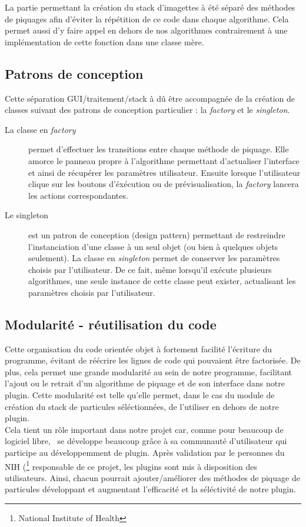 La partie permettant la création du stack d'imagettes à été séparé des méthodes de piquages afin d'éviter la répétition de ce code dans chaque algorithme. Cela permet aussi d'y faire appel en dehors de nos algorithmes contrairement à une implémentation de cette fonction dans une classe mère.

\subsection*{Patrons de conception}

Cette séparation GUI/traitement/stack à dû être accompagnée de la création de classes suivant des patrons de conception particulier : la \emph{factory} et le \emph{singleton}.
\begin{description}
\item[La classe en \emph{factory}] permet d'effectuer les transitions entre chaque méthode de piquage. Elle amorce le panneau propre à l'algorithme permettant d'actualiser l'interface et ainsi de récupérer les paramètres utilisateur. \blue Ensuite lorsque l'utilisateur clique sur les boutons d'éxécution ou de prévisualisation, la \emph{factory} lancera les actions correspondantes.\black
\item [Le singleton] est un patron de conception (design pattern) permettant de restreindre l'instanciation d'une classe à un seul objet (ou bien à quelques objets seulement). La classe en \emph{singleton} permet de conserver les paramètres choisis par l'utilisateur. De ce fait, même lorsqu'il exécute plusieurs algorithmes, une seule instance de cette classe peut exister, actualisant les paramètres choisis par l'utilisateur.
\end{description}
\blue
\subsection*{Modularité - réutilisation du code}
Cette organisation du code orientée objet à fortement facilité l'écriture du programme, évitant de réécrire les lignes de code qui pouvaient \^etre factorisée. De plus, cela permet une grande modularité au sein de notre programme, facilitant l'ajout ou le retrait d'un algorithme de piquage et de son interface dans notre plugin. Cette modularité est telle qu'elle permet, dans le cas du module de création du stack de particules séléctionnées, de l'utiliser en dehors de notre plugin.\\
Cela tient un rôle important dans notre projet car, comme pour beaucoup de logiciel libre, \imj ~se développe beaucoup gr\^ace à sa communauté d'utilisateur qui participe au développemment de plugin. Après validation par le personnes du NIH (\footnote{National Institute of Health} responsable de ce projet, les plugins sont mis à disposition des utilisateurs. Ainsi, chacun pourrait ajouter/améliorer des méthodes de piquage de particules développant et augmentant l'efficacité et la séléctivité de notre plugin.
\black
%

